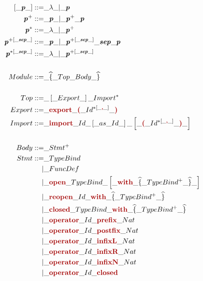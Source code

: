 {\begin{implementationfr}
{\allowdisplaybreaks
\begin{align*}
\maybe{\emph{p}} ::=& \_ \lambda \_ | \_ \emph{p}
\\
\list{\emph{p}} ::=& \_ \emph{p} \_ | \_ \emph{p}^{+} \_ \emph{p}
\\
\listZ{\emph{p}} ::=& \_ \lambda \_ | \_ \emph{p}^{+}
\\
\listSep{\emph{p}}{\emph{sep}} ::=
    & \_ \emph{p} \_
    | \_ \listSep{\emph{p}}{\emph{sep}} \_ \emph{sep} \_ \emph{p}
\\
\listSepZ{\emph{p}}{\emph{sep}} ::=
    & \_ \lambda \_
    | \_ \listSep{\emph{p}}{\emph{sep}}
\\
\\
Module ::=& \_ \scope{Top \_ Body}
\\
\\
Top ::=& \_ \maybe{Export} \_ \listZ{Import}
\\
Export ::=& \_ \lt{export} \_ \parens{\listSepZ{Id}{\lt{,}}}
\\
Import ::=& \_ \lt{import} \_ Id \_ \maybe{as \_ Id} \_
    \maybe{\parens{\listSepZ{Id}{\lt{,}}}}
\\
\\
Body ::=& \_ \list{Stmt}
\\
Stmt ::=
     & \_ TypeBind
\\
    |& \_ FuncDef
\\
    |& \_ \lt{open} \_ TypeBind \_
        \maybe{ \lt{with} \_ \scope{\list{TypeBind}} }
\\
    |& \_ \lt{reopen} \_ Id \_  \lt{with} \_
        \scope{\list{TypeBind}}
\\
    |& \_ \lt{closed} \_ TypeBind \_  \lt{with} \_
        \scope{\list{TypeBind}}
\\
    |& \_ \lt{operator} \_ Id \_ \lt{prefix}  \_ Nat
\\
    |& \_ \lt{operator} \_ Id \_ \lt{postfix} \_ Nat
\\
    |& \_ \lt{operator} \_ Id \_ \lt{infixL}  \_ Nat
\\
    |& \_ \lt{operator} \_ Id \_ \lt{infixR}  \_ Nat
\\
    |& \_ \lt{operator} \_ Id \_ \lt{infixN}  \_ Nat
\\
    |& \_ \lt{operator} \_ Id \_ \lt{closed}

\end{align*}}
\end{implementationfr}}
